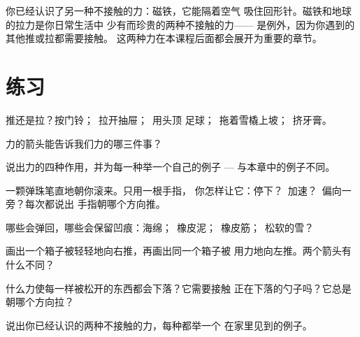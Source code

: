 \begin{remark}[老朋友]\label{rem:g2:pushes-and-pulls:magnets}
你已经认识了另一种不接触的力：磁铁，它能隔着空气
吸住回形针。磁铁和地球的拉力是你日常生活中
少有而珍贵的两种不接触的力——
是例外，因为你遇到的其他推或拉都需要接触。
这两种力在本课程后面都会展开为重要的章节。
\end{remark}

\section{练习}

\begin{exercise}[$\star$]\label{exo:g2:pushes-and-pulls:1}
推还是拉？按门铃；\ 拉开抽屉；\ 用头顶
足球；\ 拖着雪橇上坡；\ 挤牙膏。
\end{exercise}

\begin{exercise}[$\star$]\label{exo:g2:pushes-and-pulls:2}
力的箭头能告诉我们力的哪三件事？
\end{exercise}

\begin{exercise}[$\star$]\label{exo:g2:pushes-and-pulls:3}
说出力的四种作用，并为每一种举一个自己的例子 ---
与本章中的例子不同。
\end{exercise}

\begin{exercise}[$\star$]\label{exo:g2:pushes-and-pulls:4}
一颗弹珠笔直地朝你滚来。只用一根手指，
你怎样让它：停下？\ 加速？\ 偏向一旁？每次都说出
手指朝哪个方向推。
\end{exercise}

\begin{exercise}[$\star$]\label{exo:g2:pushes-and-pulls:5}
哪些会弹回，哪些会保留凹痕：海绵；\
橡皮泥；\ 橡皮筋；\ 松软的雪？
\end{exercise}

\begin{exercise}[$\star$]\label{exo:g2:pushes-and-pulls:6}
画出一个箱子被轻轻地向右推，再画出同一个箱子被
用力地向左推。两个箭头有什么不同？
\end{exercise}

\begin{exercise}[$\star$]\label{exo:g2:pushes-and-pulls:7}
什么力使每一样被松开的东西都会下落？它需要接触
正在下落的勺子吗？它总是朝哪个方向拉？
\end{exercise}

\begin{exercise}[$\star$]\label{exo:g2:pushes-and-pulls:8}
说出你已经认识的两种不接触的力，每种都举一个
在家里见到的例子。
\end{exercise}

